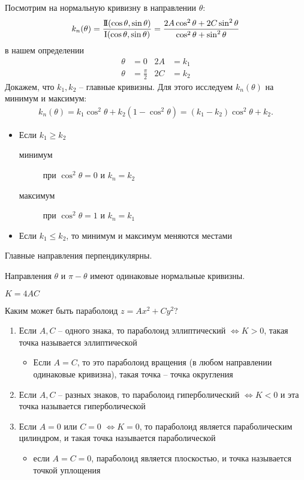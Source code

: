 \documentclass[main]{subfiles}
\begin{document}
Посмотрим на нормальную кривизну в направлении $\theta$:
\[k_{n} (\theta) = \frac{\mathrm{I\!I}(\cos \theta, \sin \theta)}{\mathrm{I}(\cos \theta, \sin \theta)} = \frac{2A \cos^2 \theta + 2C \sin^2 \theta}{\cos^2\theta + \sin^2 \theta}\]
в нашем определении
\begin{align*}
    \theta & = 0             & 2A & = k_1 \\
    \theta & = \frac{\pi}{2} & 2C & = k_2
\end{align*}
Докажем, что $k_1, k_2$ -- главные кривизны.
Для этого исследуем $k_{n}(\theta)$ на минимум и максимум:
\begin{gather*}
    k_{n}(\theta) = k_1 \cos^2 \theta + k_2(1- \cos^2 \theta) = (k_1 - k_2) \cos^2 \theta + k_2.
\end{gather*}
\begin{itemize}
    \item Если $k_1 \ge k_2$
          \begin{description}
              \item[минимум] при $\cos^2\theta = 0$ и $k_{n} = k_2$
              \item[максимум] при $\cos^2\theta = 1$ и $k_{n} = k_1$
          \end{description}
    \item Если $k_1 \le k_2$, то минимум и максимум меняются местами
\end{itemize}
\begin{corollary}
    Главные направления перпендикулярны.
\end{corollary}
\begin{corollary}
    Направления $\theta$ и $\pi - \theta$ имеют одинаковые нормальные кривизны.
\end{corollary}

\begin{remark}
    $K = 4AC$
\end{remark}
Каким может быть параболоид $z = Ax^2 + Cy^2$?


\begin{enumerate}
    \item Если $A, C$ -- одного знака, то параболоид эллиптический $\Leftrightarrow K > 0$, такая точка называется эллиптической
          \begin{itemize}
              \item Если $A=C$, то это параболоид вращения (в любом направлении одинаковые кривизна), такая точка -- точка округления
          \end{itemize}
    \item Если $A,C$ -- разных знаков, то параболоид гиперболический $\Leftrightarrow K < 0$ и эта точка называется гиперболической
    \item Если $A =0$ или $C=0$ $\Leftrightarrow K = 0$, то параболоид является параболическим цилиндром, и такая точка называется параболической
          \begin{itemize}
              \item если $A = C = 0$, параболоид является плоскостью, и точка называется точкой уплощения
          \end{itemize}
\end{enumerate}
\end{document}
